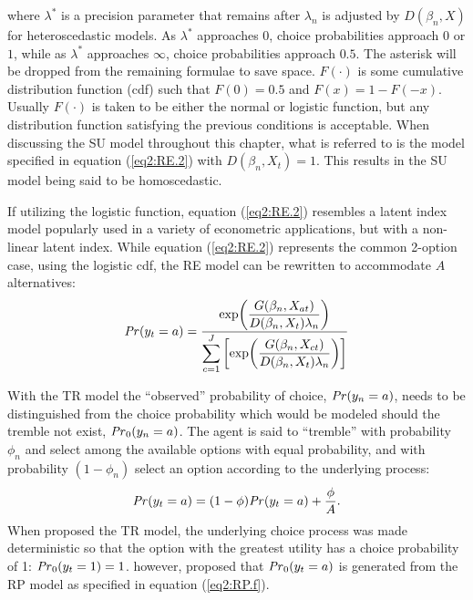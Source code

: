 \documentclass[../main.tex]{subfiles}
\begin{document}
\noindent where $\lambda^*$ is a precision parameter that remains after $\lambda_n$ is adjusted by $D(\beta_n,X)$ for heteroscedastic models.
As $\lambda^*$ approaches $0$, choice probabilities approach $0$ or $1$, while as $\lambda^*$ approaches $\infty$, choice probabilities approach $0.5$.
The asterisk will be dropped from the remaining formulae to save space.
$F(\cdot)$ is some cumulative distribution function (cdf) such that $F(0) = 0.5$ and $F(x) = 1 - F(-x)$.
Usually $F(\cdot)$ is taken to be either the normal or logistic function, but any distribution function satisfying the previous conditions is acceptable.
When discussing the SU model throughout this chapter, what is referred to is the model specified in equation (\ref{eq2:RE.2}) with $D(\beta_n,X_t) = 1$.
This results in the SU model being said to be homoscedastic.

If utilizing the logistic function, equation (\ref{eq2:RE.2}) resembles a latent index model popularly used in a variety of econometric applications, but with a non-linear latent index.
While equation (\ref{eq2:RE.2}) represents the common 2-option case, using the logistic cdf, the RE model can be rewritten to accommodate $A$ alternatives:
\begin{equation}
	\label{eq2:RE.f}
	{\ensuremath{\mathit{Pr}}}(y_t=a) =\dfrac{\exp\!\left( \dfrac{ G(\beta_n,X_{at}) }{ D(\beta_n,X_{t})\lambda_n }  \right)}{ \displaystyle\sum_{c=1}^J \left[ \exp\!\left( \dfrac{ G(\beta_n,X_{ct}) }{ D(\beta_n,X_{t})\lambda_n }  \right)  \right]  }
\end{equation}

With the TR model the \enquote{observed} probability of choice, ${\mathit{Pr}}(y_n=a)$, needs to be distinguished from the choice probability which would be modeled should the tremble not exist, ${\mathit{Pr}}_0(y_n=a)$.
The agent is said to \enquote{tremble} with probability $\phi_n$ and select among the available options with equal probability, and with probability $(1-\phi_n)$ select an option according to the underlying process:
\begin{equation}
	\label{eq2:TR.f}
	{\ensuremath{\mathit{Pr}}}(y_t=a) = (1-\phi) {\mathit{Pr}}(y_t=a) + \frac{\phi}{A}.
\end{equation}
When \textcite{Harless1994} proposed the TR model, the underlying choice process was made deterministic so that the option with the greatest utility has a choice probability of 1: ${\mathit{Pr}}_0(y_t=1) = 1$.
\textcite{Loomes2002} however, proposed that ${\mathit{Pr}}_0(y_t=a)$ is generated from the RP model as specified in equation (\ref{eq2:RP.f}).
\end{document}
